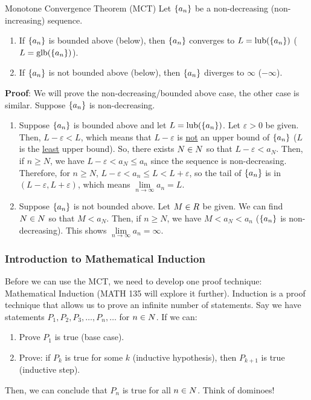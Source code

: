 \begin{Theorem}{Monotone Convergence Theorem (MCT)}{}
    Let $ \{a_n\} $ be a non-decreasing (non-increasing) sequence.
    \begin{enumerate}[(1)]
        \item If $ \{a_n\} $ is bounded above (below), then $ \{a_n\} $
              converges to $ L=\mathrm{lub}(\{a_n\}) $ ($ L=\mathrm{glb}(\{a_n\}) $).
        \item If $ \{a_n\} $ is not bounded above (below),
              then $ \{a_n\} $ diverges to $ \infty $ ($ -\infty $).
    \end{enumerate}
    \tcblower{}
    \textbf{Proof}: We will prove the non-decreasing/bounded above case,
    the other case is similar. Suppose $ \{a_n\} $ is non-decreasing.
    \begin{enumerate}[(1)]
        \item Suppose $ \{a_n\} $ is bounded above and let $ L=\mathrm{lub}(\{a_n\}) $.
              Let $ \varepsilon>0 $ be given. Then, $ L-\varepsilon<L $,
              which means that $ L-\varepsilon $ is \underline{not}
              an upper bound of $ \{a_n\} $ ($ L $ is the \underline{least}
              upper bound). So, there exists $ N\in\relax{N} $ so that $ L-\varepsilon<a_N $.
              Then, if $ n\ge N $, we have $ L-\varepsilon<a_N\le a_n $
              since the sequence is non-decreasing. Therefore,
              for $ n\ge N $, $ L-\varepsilon<a_n\le L<L+\varepsilon $,
              so the tail of $ \{a_n\} $ is in $ (L-\varepsilon,L+\varepsilon) $,
              which means $ \lim\limits_{{n} \to {\infty}}a_n=L $.
        \item Suppose $ \{a_n\} $ is not bounded above. Let $ M\in\relax{R} $
              be given. We can find $ N\in\relax{N} $ so that $ M<a_N $. Then, if
              $ n\ge N $, we have $ M<a_N<a_n $ ($ \{a_n\} $ is non-decreasing).
              This shows $ \lim\limits_{{n} \to {\infty}}a_n=\infty $.
    \end{enumerate}
\end{Theorem}
\subsubsection{Introduction to Mathematical Induction}
Before we can use the MCT, we need to develop one proof technique:
Mathematical Induction (MATH 135 will explore it further).
Induction is a proof technique that allows us to prove an infinite
number of statements. Say we have statements $ P_1,P_2,P_3,\ldots,P_n,\ldots $
for $ n\in \relax{N} $. If we can:
\begin{enumerate}[(1)]
    \item Prove $ P_1 $ is true (base case).
    \item Prove: if $ P_k $ is true for some $ k $ (inductive hypothesis),
          then $ P_{k+1} $ is true (inductive step).
\end{enumerate}
Then, we can conclude that $ P_n $ is true for all $ n\in\relax{N} $. Think of dominoes!

